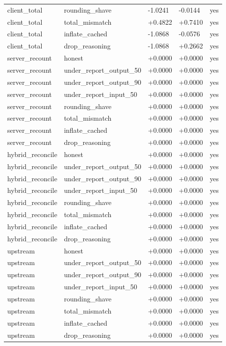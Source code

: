 \begin{table}[t]
{\begin{tabular}{lllll}
client\_total & rounding\_shave & -1.0241 & -0.0144 & yes \\
client\_total & total\_mismatch & +0.4822 & +0.7410 & yes \\
client\_total & inflate\_cached & -1.0868 & -0.0576 & yes \\
client\_total & drop\_reasoning & -1.0868 & +0.2662 & yes \\
server\_recount & honest & +0.0000 & +0.0000 & yes \\
server\_recount & under\_report\_output\_50 & +0.0000 & +0.0000 & yes \\
server\_recount & under\_report\_output\_90 & +0.0000 & +0.0000 & yes \\
server\_recount & under\_report\_input\_50 & +0.0000 & +0.0000 & yes \\
server\_recount & rounding\_shave & +0.0000 & +0.0000 & yes \\
server\_recount & total\_mismatch & +0.0000 & +0.0000 & yes \\
server\_recount & inflate\_cached & +0.0000 & +0.0000 & yes \\
server\_recount & drop\_reasoning & +0.0000 & +0.0000 & yes \\
hybrid\_reconcile & honest & +0.0000 & +0.0000 & yes \\
hybrid\_reconcile & under\_report\_output\_50 & +0.0000 & +0.0000 & yes \\
hybrid\_reconcile & under\_report\_output\_90 & +0.0000 & +0.0000 & yes \\
hybrid\_reconcile & under\_report\_input\_50 & +0.0000 & +0.0000 & yes \\
hybrid\_reconcile & rounding\_shave & +0.0000 & +0.0000 & yes \\
hybrid\_reconcile & total\_mismatch & +0.0000 & +0.0000 & yes \\
hybrid\_reconcile & inflate\_cached & +0.0000 & +0.0000 & yes \\
hybrid\_reconcile & drop\_reasoning & +0.0000 & +0.0000 & yes \\
upstream & honest & +0.0000 & +0.0000 & yes \\
upstream & under\_report\_output\_50 & +0.0000 & +0.0000 & yes \\
upstream & under\_report\_output\_90 & +0.0000 & +0.0000 & yes \\
upstream & under\_report\_input\_50 & +0.0000 & +0.0000 & yes \\
upstream & rounding\_shave & +0.0000 & +0.0000 & yes \\
upstream & total\_mismatch & +0.0000 & +0.0000 & yes \\
upstream & inflate\_cached & +0.0000 & +0.0000 & yes \\
upstream & drop\_reasoning & +0.0000 & +0.0000 & yes \\
\bottomrule
\end{tabular}}
\end{table}
